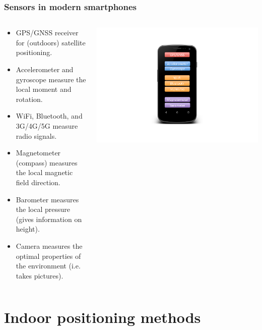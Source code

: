 \documentclass[xcolor=svgnames,english,handout]{beamer}
\begin{document}
\begin{frame}
  \frametitle{Sensors in modern smartphones}

  \begin{columns}
  \begin{column}{0.6\textwidth}
  \begin{itemize}[<+->]       
  \item \alert{GPS/GNSS receiver} for (outdoors) satellite positioning.
  \item \alert{Accelerometer and gyroscope} measure the local moment and rotation.
  \item \alert{WiFi, Bluetooth, and 3G/4G/5G} measure radio signals.
  \item \alert{Magnetometer} (compass) measures the local magnetic field direction.
  \item \alert{Barometer} measures the local pressure (gives information on height).
  \item \alert{Camera} measures the optimal properties of the environment (i.e. takes pictures).
  \end{itemize}
  \end{column}
  \begin{column}{0.4\textwidth}
  \includegraphics[width=\columnwidth]{smartphone}
  \end{column}
  \end{columns}
\end{frame}

\section{Indoor positioning methods}
\end{document}
